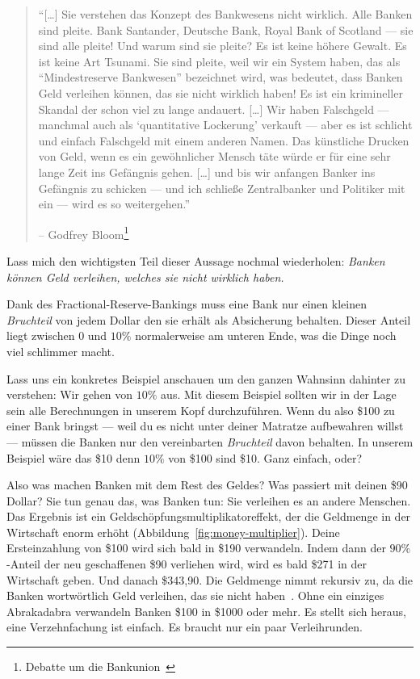 \begin{quotation}\begin{samepage}
\enquote{[\ldots] Sie verstehen das Konzept des Bankwesens nicht wirklich. Alle
Banken sind pleite. Bank Santander, Deutsche Bank, Royal Bank of Scotland --- sie
sind alle pleite! Und warum sind sie pleite? Es ist keine höhere Gewalt. Es ist
keine Art Tsunami. Sie sind pleite, weil wir ein System haben, das als
“Mindestreserve Bankwesen” bezeichnet wird, was bedeutet, dass Banken Geld
verleihen können, das sie nicht wirklich haben! Es ist ein krimineller Skandal
der schon viel zu lange andauert. [\ldots]
Wir haben Falschgeld --- manchmal auch als \enquote{quantitative Lockerung}
verkauft --- aber es ist schlicht und einfach Falschgeld mit einem anderen
Namen. Das künstliche Drucken von Geld, wenn es ein gewöhnlicher Mensch täte
würde er für eine sehr lange Zeit ins Gefängnis gehen. [\ldots] und bis wir
anfangen Banker ins Gefängnis zu schicken — und ich schließe Zentralbanker und
Politiker mit ein — wird es so weitergehen.}
\begin{flushright} -- Godfrey Bloom\footnote{Debatte um die Bankunion~\cite{godfrey-bloom}}
\end{flushright}\end{samepage}\end{quotation}

Lass mich den wichtigsten Teil dieser Aussage nochmal wiederholen:
\textit{Banken können Geld verleihen, welches sie nicht wirklich haben.}

Dank des Fractional-Reserve-Bankings muss eine Bank nur einen kleinen \textit{Bruchteil}
von jedem Dollar den sie erhält als Absicherung behalten. Dieser Anteil liegt
zwischen $0$ und $10\%$ normalerweise am unteren Ende, was die Dinge noch viel
schlimmer macht.

Lass uns ein konkretes Beispiel anschauen um den ganzen Wahnsinn dahinter zu
verstehen: Wir gehen von $10\%$ aus. Mit diesem Beispiel sollten wir in der Lage
sein alle Berechnungen in unserem Kopf durchzuführen.  Wenn du also \$100 zu
einer Bank bringst --- weil du es nicht unter deiner Matratze aufbewahren willst
--- müssen die Banken nur den vereinbarten \textit{Bruchteil} davon behalten. In
unserem Beispiel wäre das \$10 denn $10\%$ von \$100 sind \$10. Ganz einfach,
oder?

Also was machen Banken mit dem Rest des Geldes? Was passiert mit deinen \$90
Dollar? Sie tun genau das, was Banken tun: Sie verleihen es an andere Menschen.
Das Ergebnis ist ein Geldschöpfungsmultiplikatoreffekt, der die Geldmenge in der
Wirtschaft enorm erhöht (Abbildung~\ref{fig:money-multiplier}). Deine
Ersteinzahlung von \$100 wird sich bald in \$190 verwandeln. Indem dann der
$90\%$-Anteil der neu geschaffenen \$90 verliehen wird, wird es bald \$271 in
der Wirtschaft geben. Und danach \$343,90. Die Geldmenge nimmt rekursiv zu, da
die Banken wortwörtlich Geld verleihen, das sie nicht
haben~\cite{wiki:money-multiplier}. Ohne ein einziges Abrakadabra verwandeln
Banken \$100 in \$1000 oder mehr. Es stellt sich heraus, eine
Verzehnfachung ist einfach. Es braucht nur ein paar Verleihrunden.

